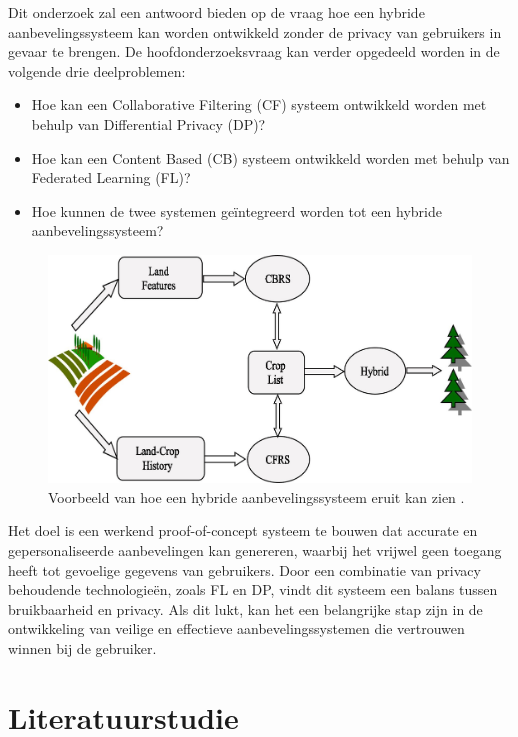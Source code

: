 Dit onderzoek zal een antwoord bieden op de vraag hoe een hybride aanbevelingssysteem kan worden ontwikkeld zonder de privacy van gebruikers in gevaar te brengen. De hoofdonderzoeksvraag kan verder opgedeeld worden in de volgende drie deelproblemen:
\begin{itemize}
  \item Hoe kan een Collaborative Filtering (CF) systeem ontwikkeld worden met behulp van Differential Privacy (DP)?
  \item Hoe kan een Content Based (CB) systeem ontwikkeld worden met behulp van Federated Learning (FL)?
  \item Hoe kunnen de twee systemen geïntegreerd worden tot een hybride aanbevelingssysteem?
\end{itemize}

\begin{figure}[h!]
  \centering
  \includegraphics[width=\linewidth]{../graphics/Hybrid_RS_Land_Voorbeeld.jpg}
  \caption{Voorbeeld van hoe een hybride aanbevelingssysteem eruit kan zien \autocite{Patel2020}.} 
  \label{fig:hybrid_rs_land_voorbeeld}
\end{figure}

Het doel is een werkend proof-of-concept systeem te bouwen dat accurate en gepersonaliseerde aanbevelingen kan genereren, waarbij het vrijwel geen toegang heeft tot gevoelige gegevens van gebruikers. Door een combinatie van privacy behoudende technologieën, zoals FL en DP, vindt dit systeem een balans tussen bruikbaarheid en privacy. Als dit lukt, kan het een belangrijke stap zijn in de ontwikkeling van veilige en effectieve aanbevelingssystemen die vertrouwen winnen bij de gebruiker.

\section{Literatuurstudie}
\label{sec:literatuurstudie}

